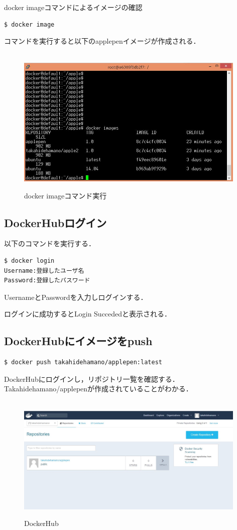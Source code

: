 docker imageコマンドによるイメージの確認
\begin{lstlisting}[basicstyle=\ttfamily\footnotesize, frame=single]
$ docker image
\end{lstlisting}
コマンドを実行すると以下のapplepenイメージが作成される．
\begin{figure}[htb]
\centering　
\includegraphics[width=11cm]{11.JPG}
\caption{docker imageコマンド実行}\label{tab:uac}
\end{figure}

\newpage 

\subsection{DockerHubログイン}
以下のコマンドを実行する．
\begin{lstlisting}[basicstyle=\ttfamily\footnotesize, frame=single]
$ docker login
Username:登録したユーザ名
Password:登録したパスワード
\end{lstlisting}
UsernameとPasswordを入力しログインする．



ログインに成功するとLogin Succededと表示される．

\newpage

\subsection{DockerHubにイメージをpush}
\begin{lstlisting}[basicstyle=\ttfamily\footnotesize, frame=single]
$ docker push takahidehamano/applepen:latest
\end{lstlisting}
DockerHubにログインし，リポジトリ一覧を確認する．Takahidehamano/applepenが作成されていることがわかる．
\begin{figure}[htb]
\centering　
\includegraphics[width=11cm]{12.JPG}
\caption{DockerHub}\label{tab:uac}
\end{figure}

